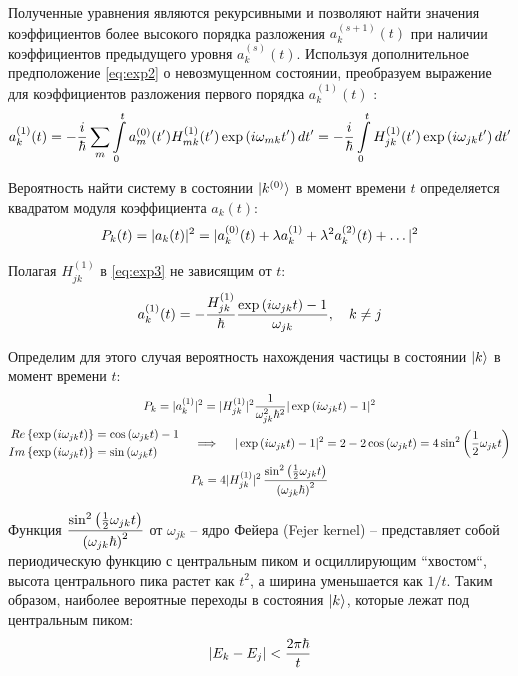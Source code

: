 Полученные уравнения являются рекурсивными и позволяют найти значения коэффициентов более высокого порядка разложения $a_k^{(s + 1)}(t)$ при наличии коэффициентов предыдущего уровня $a_k^{(s)}(t)$. Используя дополнительное предположение \ref{eq:exp2} о невозмущенном состоянии, преобразуем выражение для коэффициентов разложения первого порядка $a_k^{(1)}(t)$ :
\vverh
\begin{gather}
	a_k^{(1)}(t) = - \frac{i}{\hbar} \sum_m \int\limits_{0}^{t} a_m^{(0)} (t^\prime) H_{mk}^{(1)} (t^\prime) \exp \left( i \omega_{mk} t^\prime \right) d t^\prime = - \frac{i}{\hbar} \int\limits_0^t H_{jk}^{(1)}(t^\prime) \exp \left( i \omega_{jk} t^\prime \right) d t^\prime \label{eq:exp3}
\end{gather}

Вероятность найти систему в состоянии $\ket{k^{(0)}}$ в момент времени $t$ определяется квадратом модуля коэффициента $a_k(t)$:
\vverh
\begin{gather}
	P_{k}(t) = | a_k(t) |^2  = | a_k^{(0)}(t) + \lambda a_k^{(1)} + \lambda^2 a_k^{(2)}(t) + \dots |^2 \notag
\end{gather}

Полагая $ H_{jk}^{(1)}$ в \ref{eq:exp3} не зависящим от $t$:
\vverh
\begin{gather}
	a_k^{(1)}(t) = - \frac{H_{jk}^{(1)}}{\hbar} \frac{\exp \left( i \omega_{jk} t \right) - 1}{\omega_{jk}}, \quad k \neq j \notag
\end{gather}

Определим для этого случая вероятность нахождения частицы в состоянии $\ket{k}$ в момент времени $t$:
\vverh
\begin{gather}
	P_k = |a _k^{(1)} |^2 = | H_{jk}^{(1)} |^2 \frac{1}{\omega_{jk}^2 \hbar^2} | \exp \left( i \omega_{jk} t \right) - 1 |^2 \notag \\
	\begin{aligned}
		Re \left\{ \exp \left( i \omega_{jk} t \right) \right\} &= \cos \left( \omega_{jk} t \right) - 1 \\
		Im \left\{ \exp \left( i \omega_{jk} t \right) \right\} &= \sin \left( \omega_{jk} t \right) 
	\end{aligned} \quad \implies \quad
	| \exp \left( i \omega_{jk} t \right) - 1 |^2 = 2 - 2 \cos \left( \omega_{jk} t \right) = 4 \sin^2 \left( \frac{1}{2} \omega_{jk} t \right) \notag \\
	P_k = 4 | H_{jk}^{(1)} |^2  \, \frac{\sin^2 \left( \frac{1}{2} \omega_{jk} t \right)}{\left( \omega_{jk} \hbar \right)^2} \notag
\end{gather} 

Функция $\displaystyle \frac{\sin^2 \left( \frac{1}{2} \omega_{jk} t \right)}{\left( \omega_{jk} \hbar \right)^2}$ от $\omega_{jk}$ -- ядро Фейера (Fejer kernel) -- представляет собой периодическую функцию с центральным пиком и осциллирующим ``хвостом``, высота центрального пика растет как $t^2$, а ширина уменьшается как $1 / t$. Таким образом, наиболее вероятные переходы в состояния $\ket{k}$, которые лежат под центральным пиком: 
\vverh
\begin{gather}
	| E_k - E_j | < \frac{2 \pi \hbar}{t} \notag
\end{gather}

